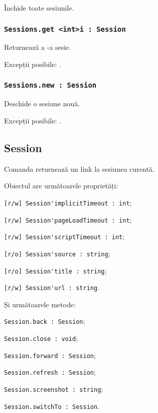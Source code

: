Închide toate sesiunile.

\subsubsection{\lstinline|Sessions.get <int>i : Session|}

Returnează a -a sesie.

Excepții posibile: .

\subsubsection{\lstinline|Sessions.new : Session|}

Deschide o sesiune nouă.

Excepții posibile: .

\subsection{{\color{orange} Session}}

Comanda \session{} returnează un link la sesiunea curentă.

Obiectul \session{} are următoarele proprietăți:
\begin{icItems}
	\item \lstinline|[r/w] Session'implicitTimeout : int|;
	\item \lstinline|[r/w] Session'pageLoadTimeout : int|;
	\item \lstinline|[r/w] Session'scriptTimeout : int|;
	\item \lstinline|[r/o] Session'source : string|;
	\item \lstinline|[r/o] Session'title : string|;
	\item \lstinline|[r/w] Session'url : string|.
\end{icItems}

Și următoarele metode:
\begin{icItems}
	\item \lstinline|Session.back : Session|;
	\item \lstinline|Session.close : void|;
	\item \lstinline|Session.forward : Session|;
	\item \lstinline|Session.refresh : Session|;
	\item \lstinline|Session.screenshot : string|;
	\item \lstinline|Session.switchTo : Session|.
\end{icItems}

